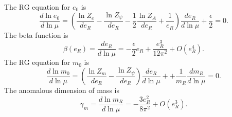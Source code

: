 The RG equation for $e_0$ is
\begin{equation}
	\frac{d\ln e_0}{d\ln \mu}
	= \left(\frac{\ln Z_e}{d e_R} - \frac{\ln Z_\psi}{d e_R} - \frac{1}{2} \frac{\ln Z_A}{d e_R} + \frac{1}{e_R} \right)\frac{de_R}{d\ln \mu} + \frac{\epsilon}{2} = 0.
\end{equation}
The beta function is
\begin{equation}
	\beta(e_R) = \frac{de_R}{d\ln \mu} = -\frac{\epsilon}{2}e_R + \frac{e_R^3}{12\pi^2} + O(e_R^4).
\end{equation}
The RG equation for $m_0$ is
\begin{equation}
	\frac{d\ln m_0}{d\ln \mu}
	= \left(\frac{\ln Z_m}{d e_R} - \frac{\ln Z_\psi}{d e_R}\right)\frac{de_R}{d\ln \mu} + + \frac{1}{m_R}\frac{d m_R}{d\ln\mu} = 0.
\end{equation}
The anomalous dimension of mass is
\begin{equation}
	\gamma_m = \frac{d \ln m_R}{d\ln\mu} = -\frac{3e_R^2}{8\pi^2} + O(e_R^3).
\end{equation}



